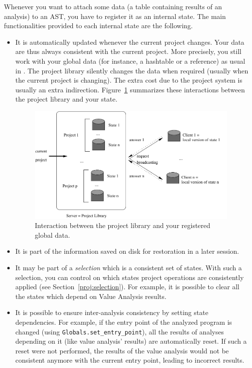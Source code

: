 Whenever you want to attach some data (\eg a table containing results of
an analysis) to an AST, you have to register it as an internal
state. The main functionalities provided to each internal state are the
following.
\begin{itemize}
\item It is automatically updated whenever the current project
  changes. Your data are thus always
  consistent with the current project. More precisely, you
  still work with your global data (for instance, a hashtable or a reference) as
  usual in \ocaml. The project library silently changes the data when required
  (usually when the current project is changing). The extra cost due to the
  project system is usually an extra
  indirection. Figure~\ref{fig:proj-mechanism} summarizes these interactions
  between the project library and your state.
  \begin{figure}[htbp]
    \centering
    \includegraphics[viewport=0 0 440 246,width=0.99\textwidth]{mecanism.pdf}
    \caption{Interaction between the project library and your registered global
      data.}\label{fig:proj-mechanism}
  \end{figure}

\item It is part of the information saved on disk for restoration
  in a later session.
\item It may be part of a \emph{selection} which is a
  consistent set of states.
  With such a selection,
  you can control on which states project operations are consistently applied
  (see Section~\ref{proj:selection}). For example, it is possible to clear all
  the states which depend on Value Analysis results.
\item It is possible to ensure inter-analysis consistency by
  setting state dependencies. For example, if the entry
  point of the analyzed program is changed (using
  \texttt{Globals.set\_entry\_point}), all
  the results of analyses depending on it (like value analysis' results) are
  automatically reset. If such a reset were not performed, the results of the
  value analysis would not be consistent anymore with the current entry point,
  leading to incorrect results.
\begin{example}
~


\end{example}
\end{itemize}
